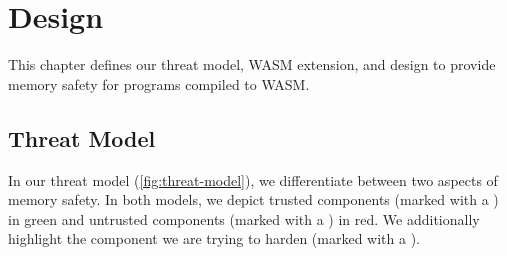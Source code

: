 \chapter{Design}
\label{ch:design}

This chapter defines our threat model, \ac{WASM} extension, and design to provide memory safety for programs compiled to \ac{WASM}.

\section{Threat Model}
\label{sec:threat-model}

In our threat model (\cref{fig:threat-model}), we differentiate between two aspects of memory safety.
In both models, we depict trusted components (marked with a ) in green and untrusted components (marked with a ) in red.
We additionally highlight the component we are trying to harden (marked with a ).

